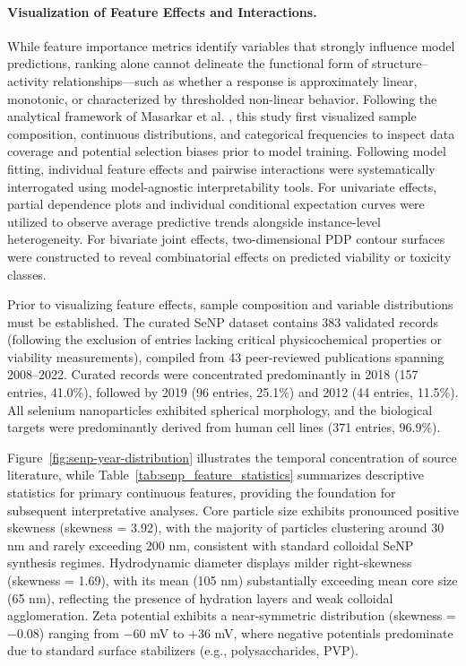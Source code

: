 \paragraph{Visualization of Feature Effects and Interactions.}
While feature importance metrics identify variables that strongly influence model predictions, ranking alone cannot delineate the functional form of structure--activity relationships—such as whether a response is approximately linear, monotonic, or characterized by thresholded non-linear behavior. Following the analytical framework of Masarkar et al. \cite{masarkar2024}, this study first visualized sample composition, continuous distributions, and categorical frequencies to inspect data coverage and potential selection biases prior to model training. Following model fitting, individual feature effects and pairwise interactions were systematically interrogated using model-agnostic interpretability tools. For univariate effects, partial dependence plots and individual conditional expectation curves were utilized to observe average predictive trends alongside instance-level heterogeneity. For bivariate joint effects, two-dimensional PDP contour surfaces were constructed to reveal combinatorial effects on predicted viability or toxicity classes.

Prior to visualizing feature effects, sample composition and variable distributions must be established. The curated SeNP dataset contains 383 validated records (following the exclusion of entries lacking critical physicochemical properties or viability measurements), compiled from 43 peer-reviewed publications spanning 2008--2022. Curated records were concentrated predominantly in 2018 (157 entries, 41.0\%), followed by 2019 (96 entries, 25.1\%) and 2012 (44 entries, 11.5\%). All selenium nanoparticles exhibited spherical morphology, and the biological targets were predominantly derived from human cell lines (371 entries, 96.9\%).

Figure~\ref{fig:senp-year-distribution} illustrates the temporal concentration of source literature, while Table~\ref{tab:senp_feature_statistics} summarizes descriptive statistics for primary continuous features, providing the foundation for subsequent interpretative analyses. Core particle size exhibits pronounced positive skewness (skewness = 3.92), with the majority of particles clustering around 30 nm and rarely exceeding 200 nm, consistent with standard colloidal SeNP synthesis regimes. Hydrodynamic diameter displays milder right-skewness (skewness = 1.69), with its mean (105 nm) substantially exceeding mean core size (65 nm), reflecting the presence of hydration layers and weak colloidal agglomeration. Zeta potential exhibits a near-symmetric distribution (skewness = $-0.08$) ranging from $-60$ mV to $+36$ mV, where negative potentials predominate due to standard surface stabilizers (e.g., polysaccharides, PVP).

